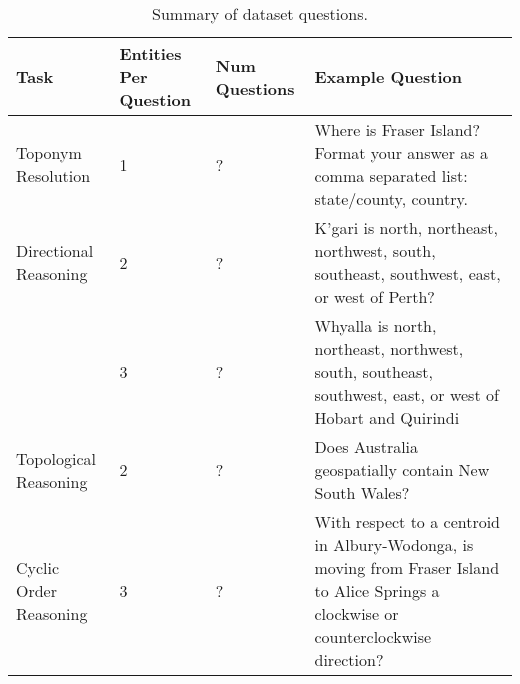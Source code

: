 \begingroup
\setlength{\tabcolsep}{4pt}
\renewcommand{\arraystretch}{1.2}
\begin{table*}[ht]
    \centering
    \begin{tabular}{lllp{210pt}}
        \hline
        \hline
        \textbf{Task} & \textbf{Entities Per Question} & \textbf{Num Questions} & \textbf{Example Question} \\
        \hline
        Toponym Resolution     & 1        & ? & Where is Fraser Island? Format your answer as a comma separated list: state/county, country. \\
        Directional Reasoning  & 2        & ? & K'gari is north, northeast, northwest, south, southeast, southwest, east, or west of Perth? \\
        ~                      & 3        & ? & Whyalla is north, northeast, northwest, south, southeast, southwest, east, or west of Hobart and Quirindi \\
        Topological Reasoning  & 2        & ? & Does Australia geospatially contain New South Wales? \\
        Cyclic Order Reasoning & 3        & ? & With respect to a centroid in Albury-Wodonga, is moving from Fraser Island to Alice Springs a clockwise or counterclockwise direction? \\
        \hline
        \hline
    \end{tabular}
    \caption{Summary of dataset questions.}
    \label{tab:dataset_design}
\end{table*}
\endgroup